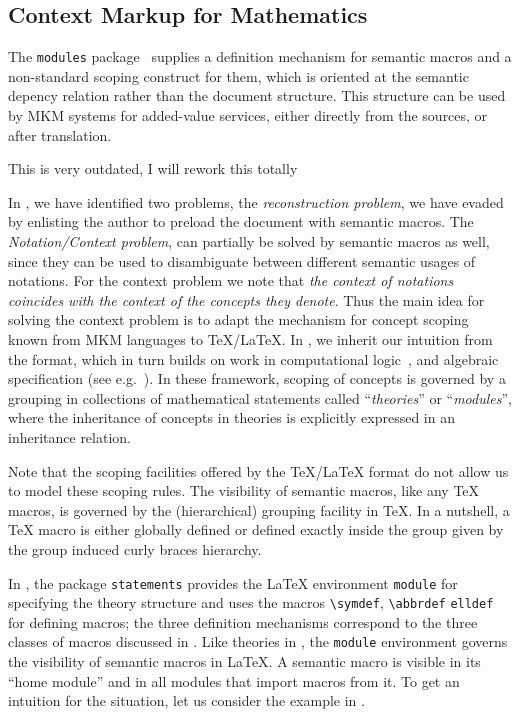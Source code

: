\subsection{Context Markup for Mathematics}
 
The \verb|modules| package~\cite{KohAmb:smmssl06} supplies a definition mechanism for
semantic macros and a non-standard scoping construct for them, which is oriented at the
semantic depency relation rather than the document structure. This structure can be used
by MKM systems for added-value services, either directly from the {\sTeX} sources, or
after translation.


\begin{oldpart}{This is very outdated, I will rework this totally}

In {}, we have identified two problems, the {\em{reconstruction
    problem}}, we have evaded by enlisting the author to preload the document with
semantic macros. The {\em{Notation/Context problem}}, can partially be solved by semantic
macros as well, since they can be used to disambiguate between different semantic usages
of notations. For the context problem we note that {\em{the context of notations coincides
    with the context of the concepts they denote}}. Thus the main idea for solving the
context problem is to adapt the mechanism for concept scoping known from MKM languages to
{\TeX/\LaTeX}. In {\stex}, we inherit our intuition from the {\omdoc} format, which in
turn builds on work in computational logic~\cite{FaGu:lt92,Farmer:aifir00}, and algebraic
specification (see e.g.~\cite{CoFI98,AutHut:tefsduc00}). In these framework, scoping of
concepts is governed by a grouping in collections of mathematical statements called
``{\em{theories}}'' or ``{\em{modules}}'', where the inheritance of concepts in theories
is explicitly expressed in an inheritance relation.

Note that the scoping facilities offered by the {\TeX/\LaTeX} format do not allow
us to model these scoping rules. The visibility of semantic macros, like any
{\TeX} macros, is governed by the (hierarchical) grouping facility in {\TeX}. In a
nutshell, a {\TeX} macro is either globally defined or defined exactly inside the
group given by the group induced curly braces hierarchy.

In {\stex}, the package {\tt{statements}} provides the {\LaTeX} environment
{\tt{module}} for specifying the theory structure and uses the macros
{\verb|\symdef|}, {\verb|\abbrdef|} {\verb|elldef|} for defining macros; the three
definition mechanisms correspond to the three classes of macros discussed in
{}. Like theories in {\omdoc}, the {\tt{module}} environment
governs the visibility of semantic macros in {\LaTeX}. A semantic macro is visible
in its ``home module'' and in all modules that import macros from it. To get an
intuition for the situation, let us consider the example in
{}.


\end{oldpart}
